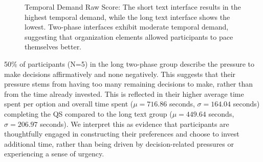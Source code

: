 \begin{figure} %
    \centering
    \captionsetup{width=0.9\linewidth, justification=justified}
    \caption{Temporal Demand Raw Score: The short text interface results in the highest temporal demand, while the long text interface shows the lowest. Two-phase interfaces exhibit moderate temporal demand, suggesting that organization elements allowed participants to pace themselves better.}
    \label{fig:temporal_cog_score}
\end{figure}

50\% of participants (N=5) in the long two-phase group describe the pressure to make decisions affirmatively and none negatively. This suggests that their pressure stems from having too many remaining decisions to make, rather than from the time already invested. This is reflected in their higher average time spent per option and overall time spent ($\mu=716.86$ seconds, $\sigma=164.04$ seconds) completing the QS compared to the long text group ($\mu=449.64$ seconds, $\sigma=206.97$ seconds). We interpret this as evidence that participants are thoughtfully engaged in constructing their preferences and choose to invest additional time, rather than being driven by decision-related pressures or experiencing a sense of urgency.

